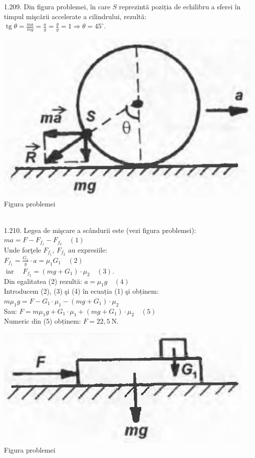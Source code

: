 1.209. Din figura problemei, în care $S$ reprezintă poziția de echilibru a sferei în timpul mişcării accelerate a cilindrului, rezultă:\\ $\operatorname{tg} \theta=\frac{m a}{m g}=\frac{a}{g}=\frac{g}{g}=1 \Rightarrow \theta=45^{\circ}$.\\ \begin{center} \includegraphics[width=0.4\linewidth]{images/2025_07_01_5b3ff9fa0d508c8e9f17g-243}\\ Figura problemei \end{center}\\

1.210. Legea de mişcare a scândurii este (vezi figura problemei):\\ $m a=F-F_{f_{1}}-F_{f_{2}} \quad (1)$\\ Unde forţele $F_{f_{1}}$, $F_{f_{2}}$ au expresiile:\\ $F_{f_{1}}=\frac{G_{1}}{g} \cdot a=\mu_{1} G_{1} \quad (2)$\\ $\operatorname{iar} \quad F_{f_{2}}=\left(m g+G_{1}\right) \cdot \mu_{2} \quad (3)$.\\ Din egalitatea (2) rezultă: $a=\mu_{1} g \quad (4)$\\ Introducem (2), (3) şi (4) în ecuația (1) şi obținem:\\ $m \mu_{1} g=F-G_{1} \cdot \mu_{1}-\left(m g+G_{1}\right) \cdot \mu_{2}$\\ Sau: $F=m \mu_{1} g+G_{1} \cdot \mu_{1}+\left(m g+G_{1}\right) \cdot \mu_{2} \quad (5)$\\ Numeric din (5) obținem: $F=22,5 \mathrm{~N}$.\\ \begin{center} \includegraphics[width=0.4\linewidth]{images/2025_07_01_5b3ff9fa0d508c8e9f17g-243(1)}\\ Figura problemei \end{center}\\

